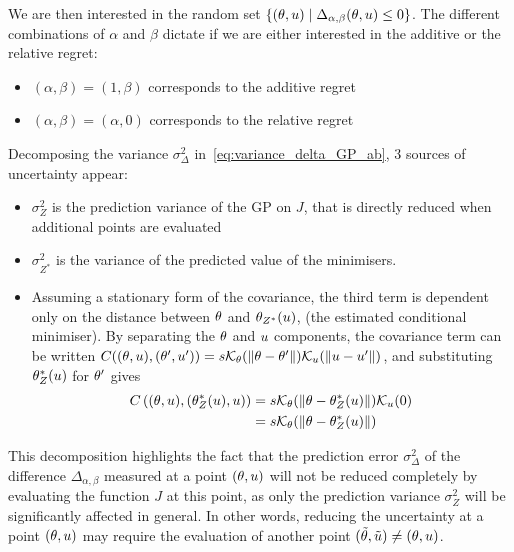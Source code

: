 \documentclass[../../Main_ManuscritThese.tex]{subfiles}
\begin{document}
We are then interested in the random set
$\{(\theta, u) \mid \Delta_{\alpha, \beta}(\theta, u) \leq 0\}$. The
different combinations of $\alpha$ and $\beta$ dictate if we are either
interested in the additive or the relative regret:
\begin{itemize}
\item $(\alpha, \beta) = (1, \beta)$ corresponds to the additive regret
\item $(\alpha, \beta) = (\alpha, 0)$ corresponds to the relative regret
\end{itemize}


Decomposing the variance $\sigma^2_{\Delta}$
in~\cref{eq:variance_delta_GP_ab}, 3 sources of uncertainty appear:
\begin{itemize}
\item $\sigma^2_{Z}$ is the prediction variance of the GP on $J$, that
  is directly reduced when additional points are evaluated
\item $\sigma^2_{Z^*}$ is the variance of the predicted value of the
  minimisers.
\item Assuming a stationary form of the covariance, the third term is
  dependent only on the distance between $\theta$ and $\theta_{Z^*}(u)$,
  (the estimated conditional minimiser). By separating the $\theta$ and
  $u$ components, the covariance term can be written
  $C((\theta,u), (\theta^{\prime},u^{\prime})) = s
  \mathcal{K}_{\theta}(\|\theta - \theta^{\prime}\|) \mathcal{K}_{u}(\|u -
  u^{\prime}\|)$, and
  substituting $\theta^*_Z(u)$ for $\theta^{\prime}$ gives
  \begin{align}
    C\left((\theta,u),(\theta^*_Z(u),u)\right) &= s  \mathcal{K}_{\theta}(\|\theta - \theta^*_Z(u)\|) \mathcal{K}_{u}(0) \\
                                                &= s  \mathcal{K}_{\theta}(\|\theta - \theta^*_Z(u)\|)
  \end{align}
\end{itemize}
This decomposition highlights the fact that the prediction error
$\sigma_{\Delta}^2$ of the difference $\Delta_{\alpha,\beta}$ measured
at a point $(\theta, u)$ will not be reduced completely by evaluating
the function $J$ at this point, as only the prediction variance
$\sigma_Z^2$ will be significantly affected in general. In other
words, reducing the uncertainty at a point $(\theta, u)$ may require
the evaluation of another point
$(\tilde{\theta},\tilde{u}) \neq (\theta, u)$.
\end{document}
